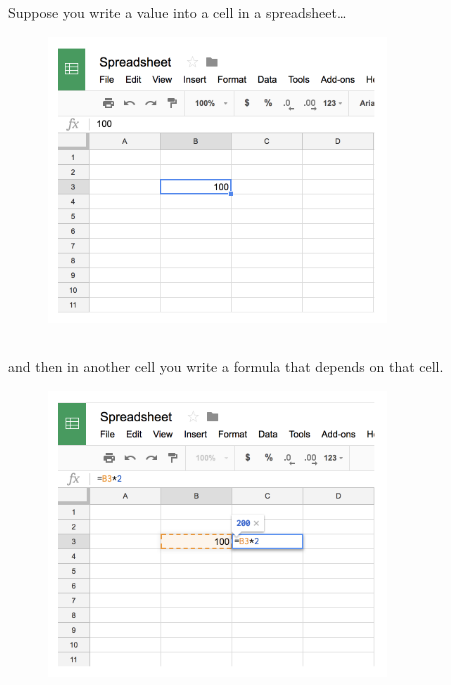 \documentclass[
  letterpaper,
  DIV=11,
  numbers=noendperiod]{scrreprt}
\begin{document}
\hypertarget{section-27}{%
\subsection{}\label{section-27}}

Suppose you write a value into a cell in a spreadsheet\ldots{}

\begin{figure}

{\centering \includegraphics[width=0.8\textwidth,height=\textheight]{./images/spreadsheet-2.png}

}

\end{figure}

\hypertarget{section-28}{%
\subsection{}\label{section-28}}

and then in another cell you write a formula that depends on that cell.

\begin{figure}

{\centering \includegraphics[width=0.8\textwidth,height=\textheight]{./images/spreadsheet-3.png}

}

\end{figure}
\end{document}
